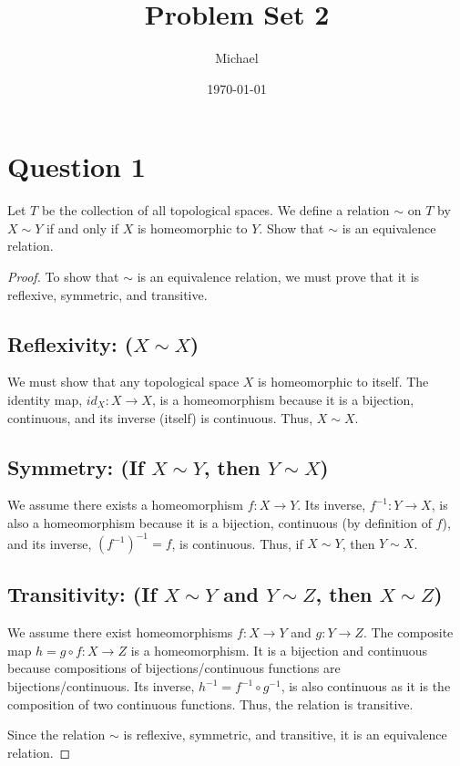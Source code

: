 \documentclass{article}
\title{Problem Set 2}
\author{Michael}
\date{\today}
\begin{document}
\maketitle

\section*{Question 1}
Let $T$ be the collection of all topological spaces. We define a relation $\sim$ on $T$ by $X \sim Y$ if and only if $X$ is homeomorphic to $Y$. Show that $\sim$ is an equivalence relation.

\begin{proof}
To show that $\sim$ is an equivalence relation, we must prove that it is reflexive, symmetric, and transitive.

\subsection*{Reflexivity: ($X \sim X$)}
We must show that any topological space $X$ is homeomorphic to itself. The identity map, $id_X: X \to X$, is a homeomorphism because it is a bijection, continuous, and its inverse (itself) is continuous. Thus, $X \sim X$.

\subsection*{Symmetry: (If $X \sim Y$, then $Y \sim X$)}
We assume there exists a homeomorphism $f: X \to Y$. Its inverse, $f^{-1}: Y \to X$, is also a homeomorphism because it is a bijection, continuous (by definition of $f$), and its inverse, $(f^{-1})^{-1}=f$, is continuous. Thus, if $X \sim Y$, then $Y \sim X$.

\subsection*{Transitivity: (If $X \sim Y$ and $Y \sim Z$, then $X \sim Z$)}
We assume there exist homeomorphisms $f: X \to Y$ and $g: Y \to Z$. The composite map $h = g \circ f: X \to Z$ is a homeomorphism. It is a bijection and continuous because compositions of bijections/continuous functions are bijections/continuous. Its inverse, $h^{-1} = f^{-1} \circ g^{-1}$, is also continuous as it is the composition of two continuous functions. Thus, the relation is transitive.

Since the relation $\sim$ is reflexive, symmetric, and transitive, it is an equivalence relation.
\end{proof}
\end{document}
